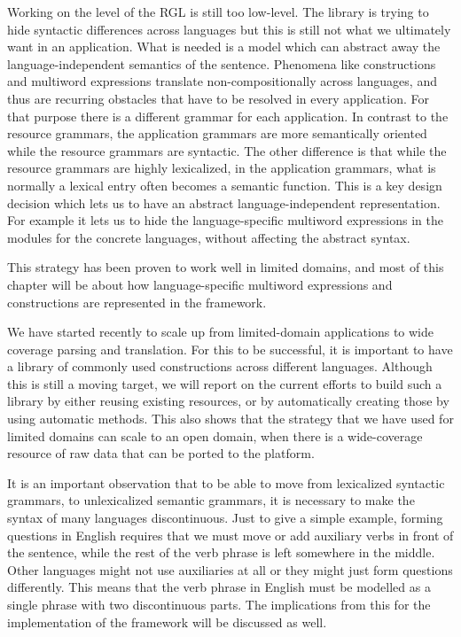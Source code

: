 \documentclass[output=paper]{LSP/langsci}
\begin{document}
Working on the level of the RGL is still too low-level. The library
is trying to hide syntactic differences across languages
but this is still not what we ultimately want in an application. 
What is needed is a model which can abstract away 
the language-independent semantics of the sentence. Phenomena
like constructions and multiword expressions translate
non-compositionally across languages, and thus are recurring obstacles that
have to be resolved in every application. For that purpose
there is a different grammar for each application.
In contrast to the resource grammars, the application grammars
are more semantically oriented while the resource grammars are syntactic.
The other difference is that while the resource grammars are highly
lexicalized, in the application grammars, what is normally a lexical
entry often becomes a semantic function. This is a key design decision
which lets us to have an abstract language-independent
representation. For example it lets us to hide the language-specific
multiword expressions in the modules for the concrete languages,
without affecting the abstract syntax.

This strategy has been proven to work well in limited domains, and most of
this chapter will be about how language-specific multiword expressions
and constructions are represented in the framework.

We have started recently to scale up from limited-domain
applications to wide coverage parsing and translation. 
For this to be successful, it is important to have a library
of commonly used constructions across different languages. 
Although this is still a moving target, we will report on the current
efforts to build such a library by either reusing existing resources,
or by automatically creating those by using automatic methods.
This also shows that the strategy that we have used for limited
domains can scale to an open domain, when there is a wide-coverage
resource of raw data that can be ported to the platform.

It is an important observation that to be able to move
from lexicalized syntactic grammars, to unlexicalized semantic
grammars, it is necessary to make the syntax of many languages
discontinuous. Just to give a simple example, forming questions
in English requires that we must move or add auxiliary verbs
in front of the sentence, while the rest of the verb phrase
is left somewhere in the middle. Other languages might not use
auxiliaries at all or they might just form questions differently.
This means that the verb phrase in English must be modelled
as a single phrase with two discontinuous parts. The implications
from this for the implementation of the framework will be discussed
as well.
\end{document}

